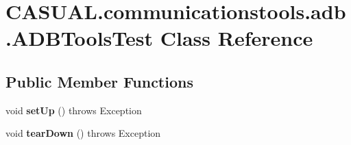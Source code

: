 \hypertarget{class_c_a_s_u_a_l_1_1communicationstools_1_1adb_1_1_a_d_b_tools_test}{\section{C\-A\-S\-U\-A\-L.\-communicationstools.\-adb.\-A\-D\-B\-Tools\-Test Class Reference}
\label{class_c_a_s_u_a_l_1_1communicationstools_1_1adb_1_1_a_d_b_tools_test}
}
\subsection*{Public Member Functions}
\begin{DoxyCompactItemize}
\item 
\hypertarget{class_c_a_s_u_a_l_1_1communicationstools_1_1adb_1_1_a_d_b_tools_test_af3c5a0cfb3fd5b0f771af0a339908a44}{void {\bfseries set\-Up} ()  throws Exception }\label{class_c_a_s_u_a_l_1_1communicationstools_1_1adb_1_1_a_d_b_tools_test_af3c5a0cfb3fd5b0f771af0a339908a44}

\item 
\hypertarget{class_c_a_s_u_a_l_1_1communicationstools_1_1adb_1_1_a_d_b_tools_test_a07fe88844c179fdb84dea6d6c7789e94}{void {\bfseries tear\-Down} ()  throws Exception }\label{class_c_a_s_u_a_l_1_1communicationstools_1_1adb_1_1_a_d_b_tools_test_a07fe88844c179fdb84dea6d6c7789e94}


\end{DoxyCompactItemize}
